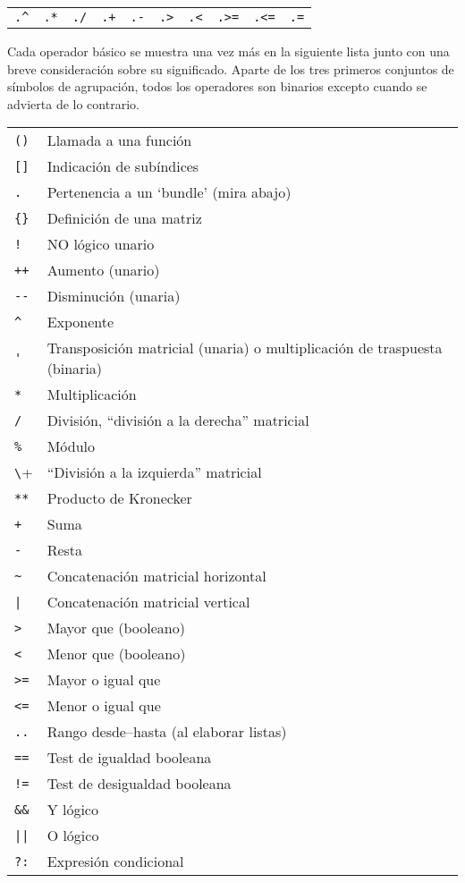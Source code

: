 \begin{center}
\begin{tabular}{cccccccccc}
\verb|.^| & \texttt{.*} & \texttt{./} & \texttt{.+} &
 \texttt{.-} & \verb|.>| & \verb|.<| & \verb|.>=| &
 \verb|.<=| & \texttt{.=} \\
\end{tabular}
\end{center}

Cada operador básico se muestra una vez más en la siguiente lista junto con
una breve consideración sobre su significado. Aparte de los tres primeros
conjuntos de símbolos de agrupación, todos los operadores son binarios
excepto cuando se advierta de lo contrario.

\begin{longtable}{ll}
\verb|()| & Llamada a una función \\
\verb|[]|  & Indicación de subíndices \\
\texttt{.} & Pertenencia a un `bundle' (mira abajo) \\
\verb|{}|  & Definición de una matriz \\
\texttt{!} & NO lógico unario \\
\texttt{++} & Aumento (unario) \\
\verb|--| & Disminución (unaria) \\
\verb|^|  & Exponente \\
\verb|'|  & Transposición matricial (unaria) o multiplicación de traspuesta (binaria) \\
\texttt{*} & Multiplicación \\
\texttt{/} & División, ``división a la derecha'' matricial \\
\texttt{\%} & Módulo \\
\verb+\+    & ``División a la izquierda'' matricial \\
\texttt{**} & Producto de Kronecker \\
\texttt{+} & Suma \\
\texttt{-} & Resta \\
\verb|~| & Concatenación matricial horizontal \\
\verb+|+ & Concatenación matricial vertical \\
\verb|>| & Mayor que (booleano) \\
\verb|<| & Menor que (booleano) \\
\verb|>=| & Mayor o igual que \\
\verb|<=| & Menor o igual que \\
\texttt{..} & Rango desde--hasta (al elaborar listas) \\
\texttt{==} & Test de igualdad booleana \\
\texttt{!=} & Test de desigualdad booleana \\
\verb|&&| & Y lógico \\
\verb+||+ & O lógico \\
\texttt{?:} & Expresión condicional \\
\end{longtable}

